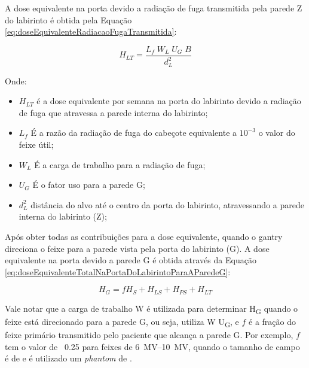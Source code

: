 \documentclass[11pt,a4paper]{article}
\begin{document}
            A dose equivalente na porta devido a radiação de fuga transmitida pela parede Z do labirinto é obtida pela Equação \ref{eq:doseEquivalenteRadiacaoFugaTransmitida}:

                \begin{equation}
                    H_{LT} = \frac{L_f \; W_L \; U_G \; B}{d_L^2}
                    \label{eq:doseEquivalenteRadiacaoFugaTransmitida}
                \end{equation}

            Onde:

                \begin{itemize}
                    \item $H_{LT}$ é a dose equivalente por semana na porta do labirinto devido a radiação de fuga que atravessa a parede interna do labirinto;
                    \item $L_f$ É a razão da radiação de fuga do cabeçote equivalente a $10^{-3}$ o valor do feixe útil;
                    \item $W_L$ É a carga de trabalho para a radiação de fuga; 
                    \item $U_G$ É o fator uso para a parede G;
                    \item $d_L^2$ distância do alvo até o centro da porta do labirinto, atravessando a parede interna do labirinto (Z);
                \end{itemize}
            
            Após obter todas as contribuições para a dose equivalente, quando o gantry direciona o feixe para a parede vista pela porta do labirinto (G). A dose equivalente na porta devido a parede G é obtida através da Equação \ref{eq:doseEquivalenteTotalNaPortaDoLabirintoParaAParedeG}:

                \begin{equation}
                    H_G = f H_S + H_{LS} + H_{PS} + H_{LT}
                    \label{eq:doseEquivalenteTotalNaPortaDoLabirintoParaAParedeG}
                \end{equation}

            Vale notar que a carga de trabalho W é utilizada para determinar H\textsubscript{G} quando o feixe está direcionado para a parede G, ou seja, utiliza W U\textsubscript{G}, e $f$ é a fração do feixe primário transmitido pelo paciente que alcança a parede G. Por exemplo, $f$ tem  o valor de ~0.25 para feixes de \qtyrange{6}{10}{MV}, quando o tamanho de campo é de  e é utilizado um \textit{phantom} de .
                
\end{document}
